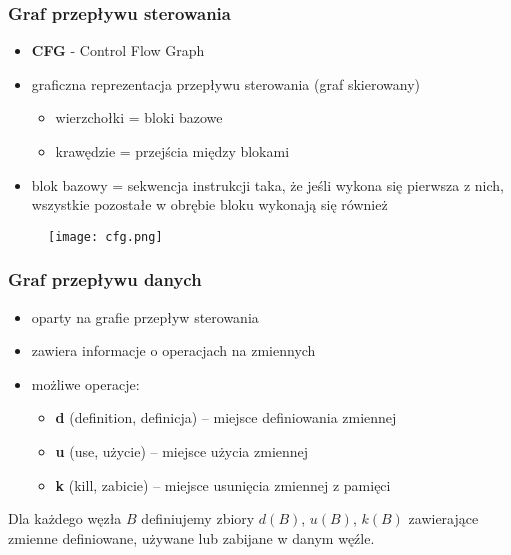 \documentclass[../main.tex]{subfiles}
\begin{document}
    \subsubsection{Graf przepływu sterowania}
    \begin{itemize}
        \item \textbf{CFG} - Control Flow Graph
        \item graficzna reprezentacja przepływu sterowania (graf skierowany)
        \begin{itemize}
            \item wierzchołki = bloki bazowe
            \item krawędzie = przejścia między blokami
        \end{itemize}
        \item blok bazowy = sekwencja instrukcji taka, że jeśli wykona się
        pierwsza z nich, wszystkie pozostałe w obrębie bloku wykonają się również
    \end{itemize}

    \begin{figure}[H]
        \texttt{[image: cfg.png]}
    \end{figure}




    \subsubsection{Graf przepływu danych}
    \begin{itemize}
        \item oparty na grafie przepływ sterowania
        \item zawiera informacje o operacjach na zmiennych
        \item możliwe operacje:
        \begin{itemize}
            \item \textbf{d} (definition, definicja) – miejsce definiowania zmiennej
            \item \textbf{u} (use, użycie) – miejsce użycia zmiennej
            \item \textbf{k} (kill, zabicie) – miejsce usunięcia zmiennej z pamięci
        \end{itemize}
    \end{itemize}

    Dla każdego węzła $B$ definiujemy zbiory $d(B)$, $u(B)$, $k(B)$ zawierające zmienne definiowane, używane lub
    zabijane w danym węźle.
\end{document}
